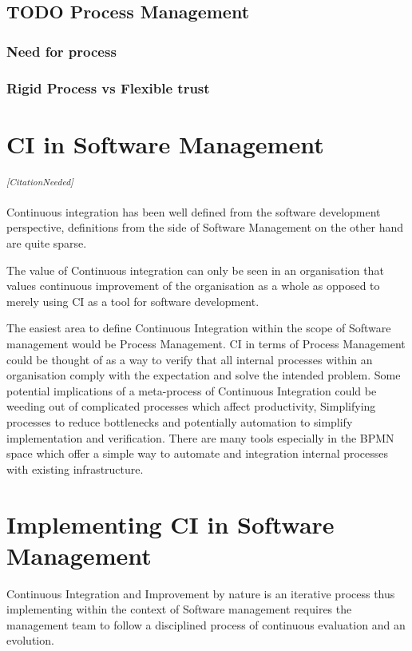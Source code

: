 \documentclass[10pt,conference]{IEEEtran}
\newcommand{\citationneeded}{\textsuperscript{\textit{[CitationNeeded]}}}
\begin{document}
\subsection*{TODO Process Management}
\subsubsection*{Need for process}
\subsubsection*{Rigid Process vs Flexible trust} \cite{benner_exploitation_2003}

\section*{CI in Software Management}

\citationneeded

Continuous integration has been well defined from the software development perspective, definitions from the side of Software Management on the other hand are quite sparse. 

The value of Continuous integration can only be seen in an organisation that values continuous improvement of the organisation as a whole as opposed to merely using CI as a tool for software development.

The easiest area to define Continuous Integration within the scope of Software management would be Process Management. CI in terms of Process Management could be thought of as a way to verify that all internal processes within an organisation comply with the expectation and solve the intended problem. Some potential implications of a meta-process of Continuous Integration could be weeding out of complicated processes which affect productivity, Simplifying processes to reduce bottlenecks and potentially automation to simplify implementation and verification. There are many tools especially in the BPMN space which offer a simple way to automate and integration internal processes with existing infrastructure. 

\section*{Implementing CI in Software Management}

Continuous Integration and Improvement by nature is an iterative process thus implementing within the context of Software management requires the management team to follow a disciplined process of continuous evaluation and an evolution.
\end{document}
